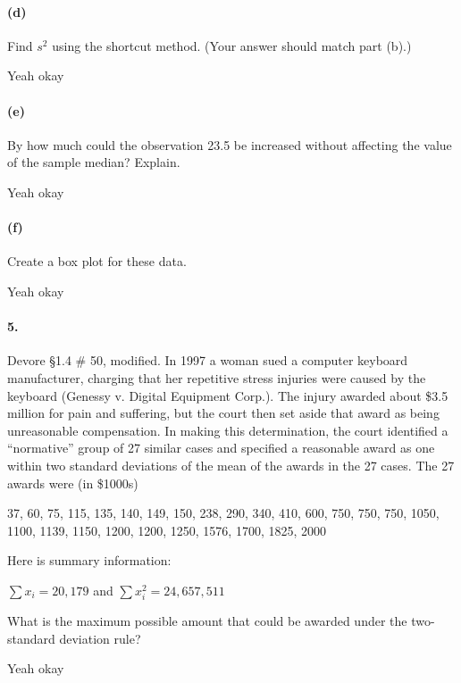     \paragraph*{(d)}
    Find $s^2$ using the shortcut method. (Your answer should match part (b).)
    
    \begin{mdframed}
        Yeah okay
    \end{mdframed}

    \paragraph*{(e)}
    By how much could the observation 23.5 be increased without affecting the value of the sample median? Explain.
    
    \begin{mdframed}
        Yeah okay
    \end{mdframed}

    \paragraph*{(f)}
    Create a box plot for these data.

    \begin{mdframed}
        Yeah okay
    \end{mdframed}

    \paragraph*{5.}
    Devore \S1.4 \# 50, modified. In 1997 a woman sued a computer keyboard manufacturer, charging that her repetitive stress injuries were caused by the keyboard (Genessy v. Digital Equipment Corp.). The injury awarded about \$3.5 million for pain and suffering, but the court then set aside that award as being unreasonable compensation. In making this determination, the court identified a “normative” group of 27 similar cases and specified a reasonable award as one within two standard deviations of the mean of the awards in the 27 cases. The 27 awards were (in \$1000s) 
    
    37, 60, 75, 115, 135, 140, 149, 150, 238, 290, 340, 410, 600, 750, 750, 750, 1050, 1100, 1139, 1150, 1200, 1200, 1250, 1576, 1700, 1825, 2000

    Here is summary information:

    $\sum x_i = 20,179$ and $\sum x_{i}^{2} = 24,657,511$

    What is the maximum possible amount that could be awarded under the two-standard deviation rule?

    \begin{mdframed}
        Yeah okay
    \end{mdframed}
